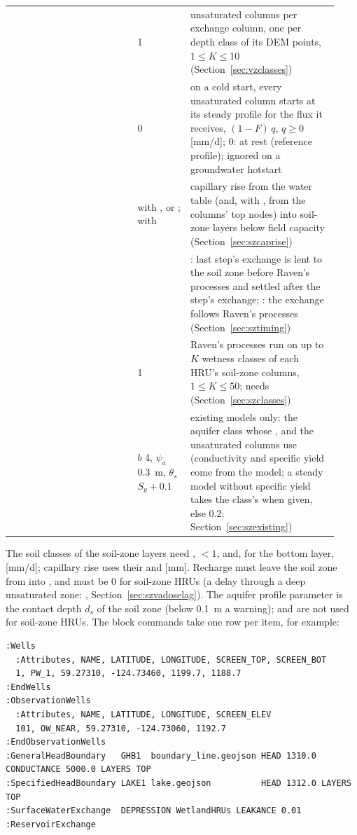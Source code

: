 \begin{longtable}{P{0.36\linewidth}P{0.15\linewidth}P{0.42\linewidth}}
 & 1 & unsaturated columns per exchange column, one per depth class of its DEM points, $1\le K\le10$ (Section~\ref{sec:vzclasses})\\
 & 0 & on a cold start, every unsaturated column starts at its steady profile for the flux it receives, $(1-F)\,q$, $q\ge0$ [mm/d]; 0: at rest (reference profile); ignored on a groundwater hotstart\\
 &  with ,  or ;  with  & capillary rise from the water table (and, with , from the columns' top nodes) into soil-zone layers below field capacity (Section~\ref{sec:szcaprise})\\
 &  & : last step's exchange is lent to the soil zone before Raven's processes and settled after the step's exchange; : the exchange follows Raven's processes (Section~\ref{sec:sztiming})\\
 & 1 & Raven's processes run on up to $K$ wetness classes of each HRU's soil-zone columns, $1\le K\le50$; needs  (Section~\ref{sec:szclasses})\\
 & $b$ 4, $\psi_a$ 0.3~m, $\theta_s$ $S_y+0.1$ & existing models only: the aquifer class whose ,  and  the unsaturated columns use (conductivity and specific yield come from the model; a steady model without specific yield takes the class's  when given, else 0.2; Section~\ref{sec:szexisting})\\\bottomrule
\end{longtable}
The soil classes of the soil-zone layers need ,  $<1$, and, for the bottom layer,
 [mm/d]; capillary rise uses their  and  [mm]. Recharge must leave the
soil zone from  into , and  must be 0 for soil-zone HRUs (a delay through a
deep unsaturated zone: , Section~\ref{sec:szvadoselag}). The
aquifer profile parameter  is the contact depth $d_s$ of the soil zone (below 0.1~m a
warning);  and  are not used for soil-zone HRUs.
The block commands take one row per item, for example:
\begin{lstlisting}
:Wells
  :Attributes, NAME, LATITUDE, LONGITUDE, SCREEN_TOP, SCREEN_BOT
  1, PW_1, 59.27310, -124.73460, 1199.7, 1188.7
:EndWells
:ObservationWells
  :Attributes, NAME, LATITUDE, LONGITUDE, SCREEN_ELEV
  101, OW_NEAR, 59.27310, -124.73060, 1192.7
:EndObservationWells
:GeneralHeadBoundary   GHB1  boundary_line.geojson HEAD 1310.0 CONDUCTANCE 5000.0 LAYERS TOP
:SpecifiedHeadBoundary LAKE1 lake.geojson          HEAD 1312.0 LAYERS TOP
:SurfaceWaterExchange  DEPRESSION WetlandHRUs LEAKANCE 0.01
:ReservoirExchange
\end{lstlisting}

